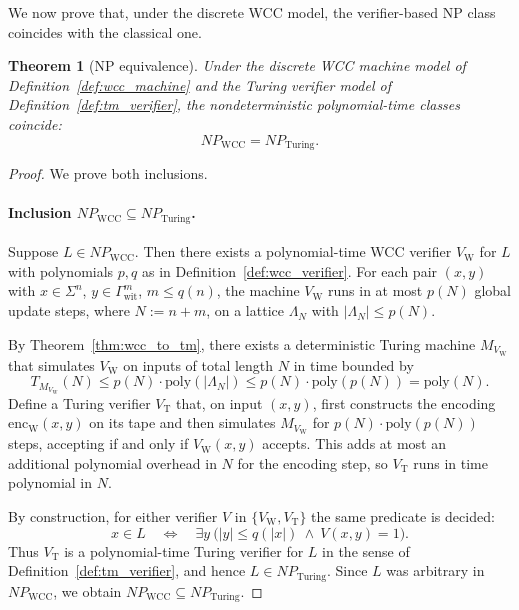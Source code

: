 \documentclass[12pt]{article}
\newtheorem{theorem}{Theorem}[section]
\begin{document}
We now prove that, under the discrete WCC model, the verifier-based NP class
coincides with the classical one.

\begin{theorem}[NP equivalence]
\label{thm:np_equiv}
Under the discrete WCC machine model of Definition~\ref{def:wcc_machine} and the
Turing verifier model of Definition~\ref{def:tm_verifier}, the
nondeterministic polynomial-time classes coincide:
\[
NP_{\mathrm{WCC}} = NP_{\mathrm{Turing}}.
\]
\end{theorem}

\begin{proof}
We prove both inclusions.

\paragraph{Inclusion $NP_{\mathrm{WCC}} \subseteq NP_{\mathrm{Turing}}$.}

Suppose $L \in NP_{\mathrm{WCC}}$. Then there exists a polynomial-time WCC
verifier $V_{\mathrm{W}}$ for $L$ with polynomials $p,q$ as in
Definition~\ref{def:wcc_verifier}. For each pair $(x,y)$ with $x \in \Sigma^n$,
$y \in \Gamma_{\mathrm{wit}}^{m}$, $m \le q(n)$, the machine $V_{\mathrm{W}}$
runs in at most $p(N)$ global update steps, where $N := n+m$, on a lattice
$\Lambda_N$ with $|\Lambda_N| \le p(N)$.

By Theorem~\ref{thm:wcc_to_tm}, there exists a deterministic Turing machine
$M_{V_{\mathrm{W}}}$ that simulates $V_{\mathrm{W}}$ on inputs of total length
$N$ in time bounded by
\[
T_{M_{V_{\mathrm{W}}}}(N) \le p(N) \cdot \mathrm{poly}(|\Lambda_N|)
\le p(N) \cdot \mathrm{poly}(p(N))
= \mathrm{poly}(N).
\]
Define a Turing verifier $V_{\mathrm{T}}$ that, on input $(x,y)$, first
constructs the encoding $\mathrm{enc}_{\mathrm{W}}(x,y)$ on its tape and then
simulates $M_{V_{\mathrm{W}}}$ for $p(N) \cdot \mathrm{poly}(p(N))$ steps,
accepting if and only if $V_{\mathrm{W}}(x,y)$ accepts. This adds at most an
additional polynomial overhead in $N$ for the encoding step, so $V_{\mathrm{T}}$
runs in time polynomial in $N$.

By construction, for either verifier $V$ in
$\{V_{\mathrm{W}},V_{\mathrm{T}}\}$ the same predicate is decided:
\[
 x\in L\quad\Longleftrightarrow\quad
 \exists y\ \bigl(|y|\le q(|x|)\ \wedge\ V(x,y)=1\bigr).
\]
Thus $V_{\mathrm{T}}$ is a polynomial-time Turing verifier for $L$ in the sense
of Definition~\ref{def:tm_verifier}, and hence $L \in NP_{\mathrm{Turing}}$.
Since $L$ was arbitrary in $NP_{\mathrm{WCC}}$, we obtain
$NP_{\mathrm{WCC}} \subseteq NP_{\mathrm{Turing}}$.


\end{proof}
\end{document}
